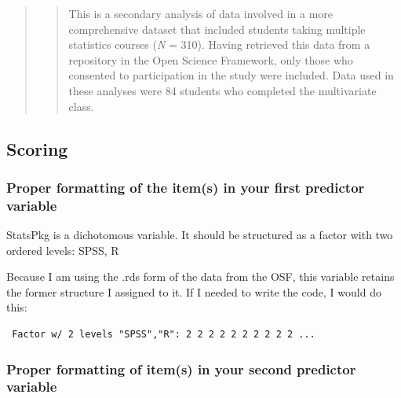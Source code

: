 \documentclass[
  11pt,
]{book}
\newenvironment{Shaded}{\begin{snugshade}}{\end{snugshade}}
\newcommand{\AttributeTok}[1]{\textcolor[rgb]{0.27,0.27,0.27}{#1}}
\newcommand{\FunctionTok}[1]{\textcolor[rgb]{0.27,0.27,0.27}{\textbf{#1}}}
\newcommand{\NormalTok}[1]{#1}
\newcommand{\OtherTok}[1]{\textcolor[rgb]{0.37,0.37,0.37}{#1}}
\newcommand{\SpecialCharTok}[1]{\textcolor[rgb]{0.43,0.43,0.43}{\textbf{#1}}}
\newcommand{\StringTok}[1]{\textcolor[rgb]{0.5,0.5,0.5}{#1}}
\begin{document}
\begin{quote}
\begin{quote}
This is a secondary analysis of data involved in a more comprehensive dataset that included students taking multiple statistics courses (\emph{N} = 310). Having retrieved this data from a repository in the Open Science Framework, only those who consented to participation in the study were included. Data used in these analyses were 84 students who completed the multivariate class.
\end{quote}
\end{quote}

\hypertarget{scoring-1}{%
\subsection{Scoring}\label{scoring-1}}

\hypertarget{proper-formatting-of-the-items-in-your-first-predictor-variable}{%
\subsubsection*{Proper formatting of the item(s) in your first predictor variable}\label{proper-formatting-of-the-items-in-your-first-predictor-variable}}


StatsPkg is a dichotomous variable. It should be structured as a factor with two ordered levels: SPSS, R

Because I am using the .rds form of the data from the OSF, this variable retains the former structure I assigned to it. If I needed to write the code, I would do this:

\begin{Shaded}
\end{Shaded}

\begin{verbatim}
 Factor w/ 2 levels "SPSS","R": 2 2 2 2 2 2 2 2 2 2 ...
\end{verbatim}

\hypertarget{proper-formatting-of-items-in-your-second-predictor-variable}{%
\subsubsection*{Proper formatting of item(s) in your second predictor variable}\label{proper-formatting-of-items-in-your-second-predictor-variable}}
\end{document}
